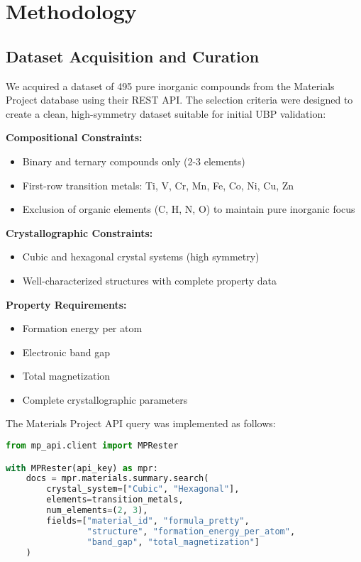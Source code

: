 \documentclass[12pt,a4paper]{article}
\begin{document}
\section{Methodology}

\subsection{Dataset Acquisition and Curation}

We acquired a dataset of 495 pure inorganic compounds from the Materials Project database \cite{jain2013commentary} using their REST API. The selection criteria were designed to create a clean, high-symmetry dataset suitable for initial UBP validation:

\textbf{Compositional Constraints:}
\begin{itemize}
    \item Binary and ternary compounds only (2-3 elements)
    \item First-row transition metals: Ti, V, Cr, Mn, Fe, Co, Ni, Cu, Zn
    \item Exclusion of organic elements (C, H, N, O) to maintain pure inorganic focus
\end{itemize}

\textbf{Crystallographic Constraints:}
\begin{itemize}
    \item Cubic and hexagonal crystal systems (high symmetry)
    \item Well-characterized structures with complete property data
\end{itemize}

\textbf{Property Requirements:}
\begin{itemize}
    \item Formation energy per atom
    \item Electronic band gap
    \item Total magnetization
    \item Complete crystallographic parameters
\end{itemize}

The Materials Project API query was implemented as follows:

\begin{lstlisting}[language=Python, caption=Materials Project Data Acquisition]
from mp_api.client import MPRester

with MPRester(api_key) as mpr:
    docs = mpr.materials.summary.search(
        crystal_system=["Cubic", "Hexagonal"],
        elements=transition_metals,
        num_elements=(2, 3),
        fields=["material_id", "formula_pretty", 
                "structure", "formation_energy_per_atom",
                "band_gap", "total_magnetization"]
    )
\end{lstlisting}
\end{document}
